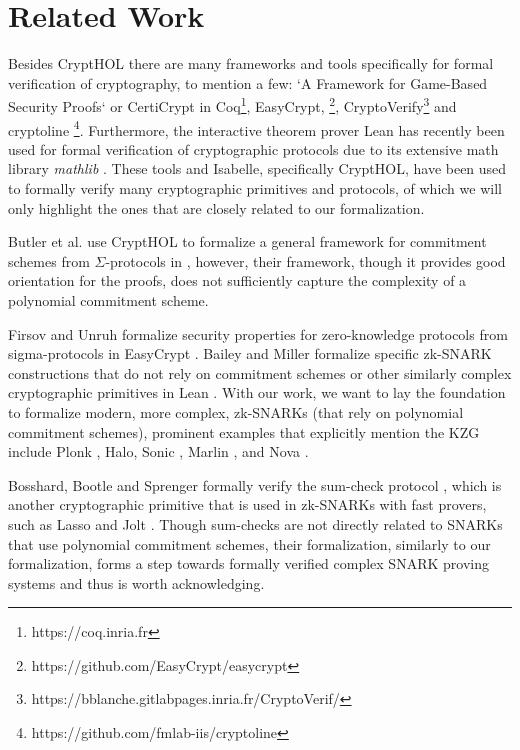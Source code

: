 \section*{Related Work}
Besides CryptHOL there are many frameworks and tools specifically for formal verification of cryptography, to mention a few: `A Framework for Game-Based Security Proofs` \parencite{game_based_coq} or CertiCrypt \parencite{crypto_coq} in Coq\footnote{https://coq.inria.fr}, EasyCrypt, \footnote{https://github.com/EasyCrypt/easycrypt}, CryptoVerify\footnote{https://bblanche.gitlabpages.inria.fr/CryptoVerif/} and cryptoline \footnote{https://github.com/fmlab-iis/cryptoline}. Furthermore, the interactive theorem prover Lean \parencite{Lean} has recently been used for formal verification of cryptographic protocols due to its extensive math library \textit{mathlib} \parencite{Lean_groth16}.
These tools and Isabelle, specifically CryptHOL, have been used to formally verify many cryptographic primitives and protocols, of which we will only highlight the ones that are closely related to our formalization.

Butler et al. use CryptHOL to formalize a general framework for commitment schemes from $\Sigma$-protocols in \parencite{sigma_commit_crypto}, however, their framework, though it provides good orientation for the proofs, does not sufficiently capture the complexity of a polynomial commitment scheme.

Firsov and Unruh formalize security properties for zero-knowledge protocols from sigma-protocols in EasyCrypt \parencite{zk_easycrypt}.
Bailey and Miller formalize specific zk-SNARK constructions that do not rely on commitment schemes or other similarly complex cryptographic primitives in Lean \parencite{Lean_groth16}. With our work, we want to lay the foundation to formalize modern, more complex, zk-SNARKs (that rely on polynomial commitment schemes), prominent examples that explicitly mention the KZG include Plonk \parencite{plonk}, Halo\parencite{halo}, Sonic \parencite{sonic}, Marlin \parencite{marlin}, and Nova \parencite{nova}.

Bosshard, Bootle and Sprenger formally verify the sum-check protocol \parencite{sumcheck_Isabelle}, which is another cryptographic primitive that is used in zk-SNARKs with fast provers, such as Lasso and Jolt \parencite{Lasso, jolt}. Though sum-checks are not directly related to SNARKs that use polynomial commitment schemes, their formalization, similarly to our formalization, forms a step towards formally verified complex SNARK proving systems and thus is worth acknowledging.